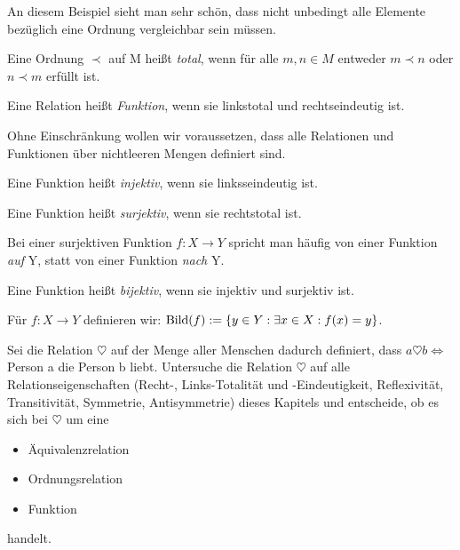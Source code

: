 \documentclass[10pt]{scrbook}
\begin{document}
An diesem Beispiel sieht man sehr schön, dass nicht unbedingt alle Elemente bezüglich eine Ordnung vergleichbar sein müssen.

\begin{Def}
Eine Ordnung $\prec$ auf M heißt \emph{total}, wenn für alle $m, n\in M$ entweder $m \prec n$ oder $n \prec m$ erfüllt ist.
\end{Def}

\begin{Def}
Eine Relation heißt \emph{Funktion}, wenn sie linkstotal und rechtseindeutig ist.
\end{Def}

\begin{Bem}
Ohne Einschränkung wollen wir voraussetzen, dass alle Relationen und Funktionen über nichtleeren Mengen definiert sind.
\end{Bem}

\begin{Def}
Eine Funktion heißt \emph{injektiv}, wenn sie linksseindeutig ist.
\end{Def}

\begin{Def}
Eine Funktion heißt \emph{surjektiv}, wenn sie rechtstotal ist.
\end{Def}
\begin{Bem}
Bei einer surjektiven Funktion $f: X\rightarrow Y$ spricht man häufig von einer Funktion \emph{auf} Y, statt von einer Funktion \emph{nach} Y.
\end{Bem}

\begin{Def}
Eine Funktion heißt \emph{bijektiv}, wenn sie injektiv und surjektiv ist.
\end{Def}

\begin{Def}
Für $f: X\rightarrow Y$ definieren wir: $\operatorname{Bild}(f):=\left\{y\in Y: \exists x\in X: f(x)=y\right\}$.
\end{Def}

\begin{Auf}
Sei die Relation $\heartsuit$ auf der Menge aller Menschen dadurch definiert, dass $a \heartsuit b\Leftrightarrow$ Person a die Person b liebt. Untersuche die Relation $\heartsuit$ auf alle Relationseigenschaften (Recht-, Links-Totalität und -Eindeutigkeit, Reflexivität, Transitivität, Symmetrie, Antisymmetrie) dieses Kapitels und entscheide, ob es sich bei $\heartsuit$ um eine
\begin{itemize}
\item Äquivalenzrelation
\item Ordnungsrelation
\item Funktion
\end{itemize}
handelt.
\end{Auf}
\end{document}
